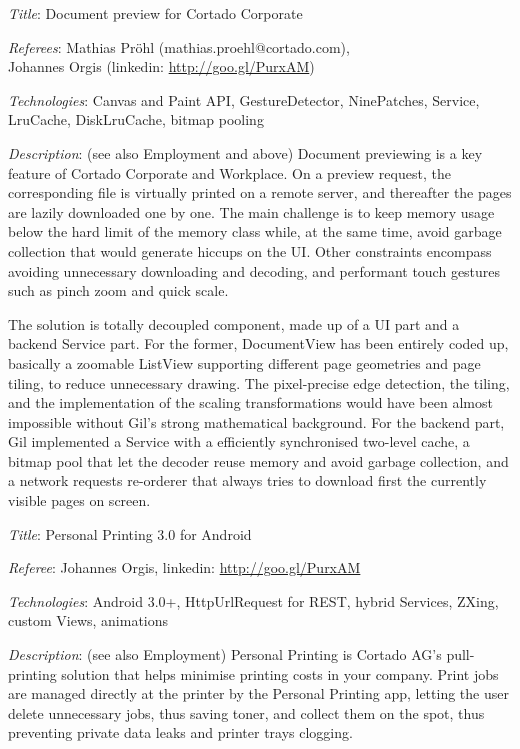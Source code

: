 \documentclass[letterpaper]{article}
\renewenvironment{itemize}{
  \begin{list}{}{
    \setlength{\leftmargin}{1.5em}
  }
}{
  \end{list}
}
\newenvironment{itemize1}{
  \begin{list}{}{
    \setlength{\leftmargin}{0em}
  }
}{
  \end{list}
}
\begin{document}
\begin{itemize1}
\item
\begin{itemize}
\item {\it Title}: Document preview for Cortado Corporate 
\item {\it Referees}: Mathias Pr\"ohl (mathias.proehl@cortado.com),
    \\\phantom{xxxxxxx.}Johannes Orgis (linkedin: \url{http://goo.gl/PurxAM})
\item {\it Technologies}: Canvas and Paint API, GestureDetector, NinePatches, Service, LruCache, DiskLruCache, bitmap pooling
\item {\it Description}: (see also Employment and above) Document previewing is a key feature of Cortado Corporate and Workplace. On a preview request, the corresponding file is virtually printed on a remote server, and thereafter the pages are lazily downloaded one by one. The main challenge is to keep memory usage below the hard limit of the memory class while, at the same time, avoid garbage collection that would generate hiccups on the UI. Other constraints encompass avoiding unnecessary downloading and decoding, and performant touch gestures such as pinch zoom and quick scale.
\medskip

The solution is totally decoupled component, made up of a UI part and a backend Service part. For the former, DocumentView has been entirely coded up, basically a zoomable ListView supporting different page geometries and page tiling, to reduce unnecessary drawing. The pixel-precise edge detection, the tiling, and the implementation of the scaling transformations would have been almost impossible without Gil's strong mathematical background. For the backend part, Gil implemented a Service with a efficiently synchronised two-level cache, a bitmap pool that let the decoder reuse memory and avoid garbage collection, and a network requests re-orderer that always tries to download first the currently visible pages on screen.
\end{itemize}

\bigskip

\item
\begin{itemize}
\item {\it Title}: Personal Printing 3.0 for Android 
\item {\it Referee}: Johannes Orgis, linkedin: \url{http://goo.gl/PurxAM}
\item {\it Technologies}: Android 3.0+, HttpUrlRequest for REST, hybrid Services, ZXing, custom Views, animations
\item {\it Description}: (see also Employment) Personal Printing is Cortado AG's pull-printing solution that helps minimise printing costs in your company. Print jobs are managed directly at the printer by the Personal Printing app, letting the user delete unnecessary jobs, thus saving toner, and collect them on the spot, thus preventing private data leaks and printer trays clogging.
\medskip


\end{itemize}
\end{itemize1}
\end{document}
